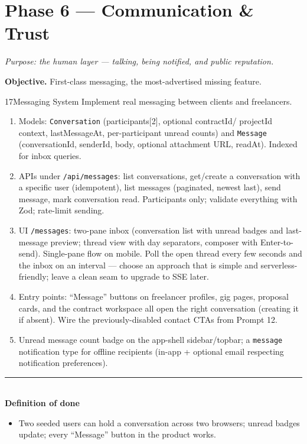 \documentclass[11pt,a4paper]{article}
\newcommand{\dod}{\medskip\noindent\textcolor{donegreen}{\rule{\linewidth}{0.5pt}}\\[1mm]\textbf{\textcolor{donegreen}{Definition of done}}\\[-2mm]}
\newcommand{\objective}[1]{\noindent\textbf{Objective.} #1\medskip}
\begin{document}
\section{Phase 6 --- Communication \& Trust}

\textit{Purpose: the human layer --- talking, being notified, and public
reputation.}

\objective{First-class messaging, the most-advertised missing feature.}

\begin{promptbox}{17}{Messaging System}
Implement real messaging between clients and freelancers.

\begin{enumerate}[leftmargin=1.6em]
  \item Models: \texttt{Conversation} (participants[2], optional contractId/
        projectId context, lastMessageAt, per-participant unread counts) and
        \texttt{Message} (conversationId, senderId, body, optional attachment URL,
        readAt). Indexed for inbox queries.
  \item APIs under \texttt{/api/messages}: list conversations, get/create a
        conversation with a specific user (idempotent), list messages (paginated,
        newest last), send message, mark conversation read. Participants only;
        validate everything with Zod; rate-limit sending.
  \item UI \texttt{/messages}: two-pane inbox (conversation list with unread badges
        and last-message preview; thread view with day separators, composer with
        Enter-to-send). Single-pane flow on mobile. Poll the open thread every few
        seconds and the inbox on an interval --- choose an approach that is simple
        and serverless-friendly; leave a clean seam to upgrade to SSE later.
  \item Entry points: ``Message'' buttons on freelancer profiles, gig pages, proposal
        cards, and the contract workspace all open the right conversation
        (creating it if absent). Wire the previously-disabled contact CTAs from
        Prompt 12.
  \item Unread message count badge on the app-shell sidebar/topbar; a
        \texttt{message} notification type for offline recipients (in-app +
        optional email respecting notification preferences).
\end{enumerate}

\dod
\begin{itemize}[leftmargin=1.6em]
  \item Two seeded users can hold a conversation across two browsers; unread badges
        update; every ``Message'' button in the product works.
\end{itemize}
\end{promptbox}
\end{document}
